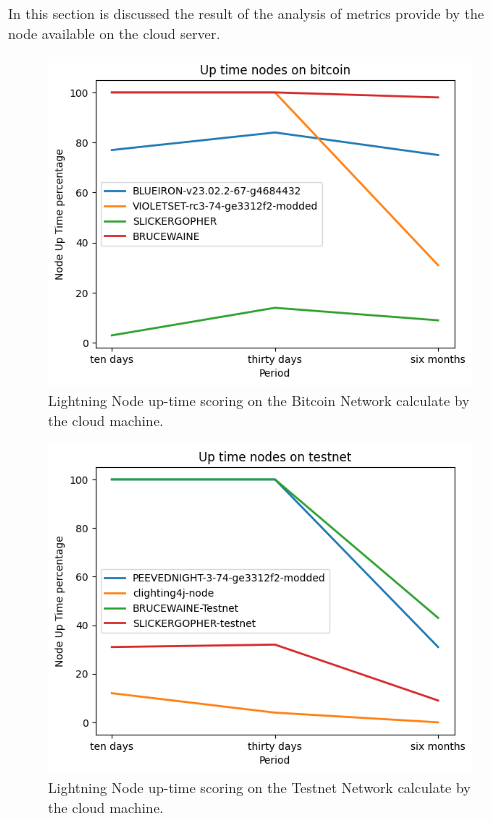 In this section is discussed the result of the analysis of metrics provide by 
the node available on the cloud server.

\begin{figure}
    \begin{center}
      \includegraphics[scale=0.7]{imgs/bitcoin_uptime.png}
    \end{center}
    \caption{Lightning Node up-time scoring on the Bitcoin Network calculate by the cloud machine.}
    \label{fig:lnmetrics_uptime_bitcoin}
\end{figure}

\begin{figure}
    \begin{center}
      \includegraphics[scale=0.7]{imgs/testnet_uptime.png}
    \end{center}
    \caption{Lightning Node up-time scoring on the Testnet Network calculate by the cloud machine.}
    \label{fig:lnmetrics_uptime_testnet}
\end{figure}

